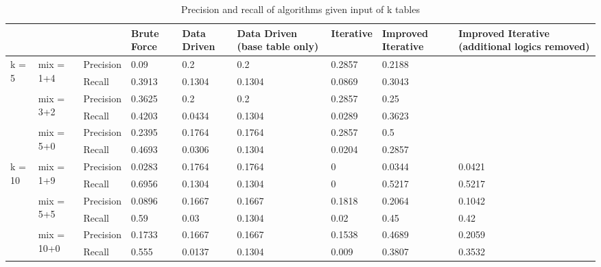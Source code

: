 \begin{table}[h!]
    \centering
    \scriptsize
    \begin{center}
      \caption{Precision and recall of algorithms given input of k tables}
      \label{tab:Precision-and-recall-of-algorithms-given-input-of-k-tables}
      \begin{tabular}{|p{}|p{}|p{}|p{}|p{}|p{}|p{}|p{}|p{}|}  
        \hline
        & & & \textbf{Brute Force} & \textbf{Data Driven} & \textbf{Data Driven (base table only)} & \textbf{Iterative} & \textbf{Improved Iterative} & \textbf{Improved Iterative (additional logics removed)}\\
        \hline
        \multirow{6}{*}{k = 5} & \multirow{2}{*}{mix = 1+4} & Precision & 0.09 & 0.2 & 0.2 & 0.2857 & 0.2188 & \\
        \cline{3-9}
        & & Recall & 0.3913 & 0.1304 & 0.1304 & 0.0869 & 0.3043 & \\
        \cline{2-9}
        & \multirow{2}{*}{mix = 3+2} & Precision & 0.3625 & 0.2 &  0.2 & 0.2857 & 0.25 & \\
        \cline{3-9}
        & & Recall & 0.4203 & 0.0434 & 0.1304 & 0.0289 & 0.3623 & \\
        \cline{2-9}
        & \multirow{2}{*}{mix = 5+0} & Precision & 0.2395 & 0.1764 & 0.1764 & 0.2857 & 0.5 & \\
        \cline{3-9}
        & & Recall & 0.4693 & 0.0306 & 0.1304 & 0.0204 & 0.2857 & \\
        \hline        
        \multirow{6}{*}{k = 10} & \multirow{2}{*}{mix = 1+9} & Precision & 0.0283 & 0.1764 & 0.1764 & 0 & 0.0344 & 0.0421 \\
        \cline{3-9}
        & & Recall & 0.6956 & 0.1304 & 0.1304 & 0 & 0.5217 & 0.5217 \\
        \cline{2-9}
        & \multirow{2}{*}{mix = 5+5} & Precision & 0.0896 & 0.1667 & 0.1667 & 0.1818 & 0.2064 & 0.1042 \\
        \cline{3-9}
        & & Recall & 0.59 & 0.03 & 0.1304 & 0.02 & 0.45 & 0.42 \\
        \cline{2-9}
        & \multirow{2}{*}{mix = 10+0} & Precision & 0.1733 & 0.1667 & 0.1667 & 0.1538 & 0.4689 & 0.2059 \\
        \cline{3-9}
        & & Recall & 0.555 & 0.0137 & 0.1304 & 0.009 & 0.3807 & 0.3532 \\
        \hline
      \end{tabular}
    \end{center}
\end{table}

